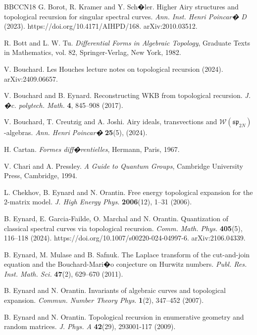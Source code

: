 \documentclass[reqno,11pt]{amsart}
\theoremstyle{plain}
\theoremstyle{definition}
\theoremstyle{remark}
\numberwithin{equation}{section}
\newcommand{\1}{\mathds{1}}
\newcommand{\2}{\frac{1}{2}}
\begin{document}
{\begin{thebibliography}{BBCCN18}
		G. Borot, R. Kramer and Y. Sch�ler. Higher Airy structures and topological recursion for singular spectral curves. \textit{Ann. Inst. Henri Poincar� D} (2023). https://doi.org/10.4171/AIHPD/168. arXiv:2010.03512.
		
		R. Bott and L. W. Tu. \textit{Differential Forms in Algebraic Topology}, Graduate Texts in Mathematics, vol. 82, Springer-Verlag, New York, 1982.
		
		V. Bouchard. Les Houches lecture notes on topological recursion (2024). arXiv:2409.06657.
		
		V. Bouchard and B. Eynard. Reconstructing WKB from topological recursion. \textit{J. �c. polytech. Math.} \textbf{4}, 845--908 (2017). 
		
		V. Bouchard, T. Creutzig and A. Joshi. Airy ideals, transvections and $\mathcal{W}(\mathfrak{sp}_{2N})$-algebras. \textit{Ann. Henri Poincar�} \textbf{25}(5), (2024). 
		
		H. Cartan. \textit{Formes diff�rentielles}, Hermann, Paris, 1967.
		
		V. Chari and A. Pressley. \textit{A Guide to Quantum Groups}, Cambridge University Press, Cambridge, 1994.
		
		L. Chekhov, B. Eynard and N. Orantin. Free energy topological expansion for the $2$-matrix model. \textit{J. High Energy Phys.} \textbf{2006}(12), 1--31 (2006). 
		
		B. Eynard, E. Garcia-Failde, O. Marchal and N. Orantin. Quantization of classical spectral curves via topological recursion. \textit{Comm. Math. Phys.} \textbf{405}(5), 116--118 (2024). https://doi.org/10.1007/s00220-024-04997-6. arXiv:2106.04339.
		
		B. Eynard, M. Mulase and B. Safnuk. The Laplace transform of the cut-and-join equation and the Bouchard-Mari�o conjecture on Hurwitz numbers. \textit{Publ. Res. Inst. Math. Sci.} \textbf{47}(2), 629--670 (2011). 
		
		B. Eynard and N. Orantin. Invariants of algebraic curves and topological expansion. \textit{Commun. Number Theory Phys.} \textbf{1}(2), 347--452 (2007). 
		
		B. Eynard and N. Orantin. Topological recursion in enumerative geometry and random matrices. \textit{J. Phys. A} \textbf{42}(29), 293001-117 (2009).
		

\end{thebibliography}}
\end{document}
